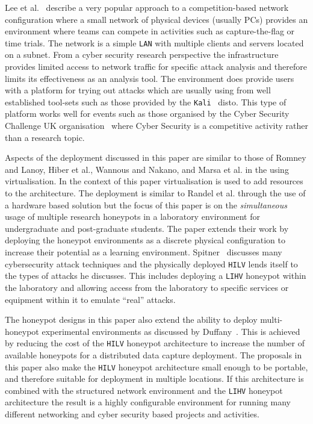 \documentclass[10pt,journal]{IEEEtran}
\begin{document}
Lee et al.~\cite{LUFC:11} describe a very popular approach to a competition-based network configuration where a small network of physical devices (usually PCs) provides an environment where teams can compete in activities such as capture-the-flag or time trials. The network is a simple \texttt{LAN} with multiple clients and servers located on a subnet. From a cyber security research perspective the infrastructure provides limited access to network traffic for specific attack analysis and therefore limits its effectiveness as an analysis tool. The environment does provide users with a platform for trying out attacks which are usually using from well established tool-sets such as those provided by the \texttt{Kali}~\cite{OS:17} disto. This type of platform works well for events such as those organised by the Cyber Security Challenge UK organisation~\cite{CSCUK:18} where Cyber Security is a competitive activity rather than a research topic.   

Aspects of the deployment discussed in this paper are similar to those of Romney and Lanoy, Hiber et al., Wannous and Nakano, and Marsa et al. in the using virtualisation. In the context of this paper virtualisation is used to add resources to the architecture. The deployment is similar to Randel et al. through the use of a hardware based solution but the focus of this paper is on the \textit{simultaneous} usage of multiple research honeypots in a laboratory environment for undergraduate and post-graduate students. The paper extends their work by deploying the honeypot environments as a discrete physical configuration to increase their potential as a learning environment. Spitner~\cite{LS:03} discusses many cybersecurity attack techniques and the physically deployed \texttt{HILV} lends itself to the types of attacks he discusses. This includes deploying a \texttt{LIHV} honeypot within the laboratory and allowing access from the laboratory to specific services or equipment within it to emulate ``real'' attacks.

The honeypot designs in this paper also extend the ability to deploy multi-honeypot
experimental environments as discussed by Duffany~\cite{JD:08}. This is
achieved by reducing the cost of the \texttt{HILV} honeypot architecture to increase the
number of available honeypots for a distributed data capture deployment. The
proposals in this paper also make the \texttt{HILV} honeypot architecture small
enough to be portable, and therefore suitable for deployment in 
multiple locations. If this architecture is combined with the structured network environment and the \texttt{LIHV} honeypot architecture the result is a highly configurable environment for running many different networking and cyber security based projects and activities.
\end{document}
